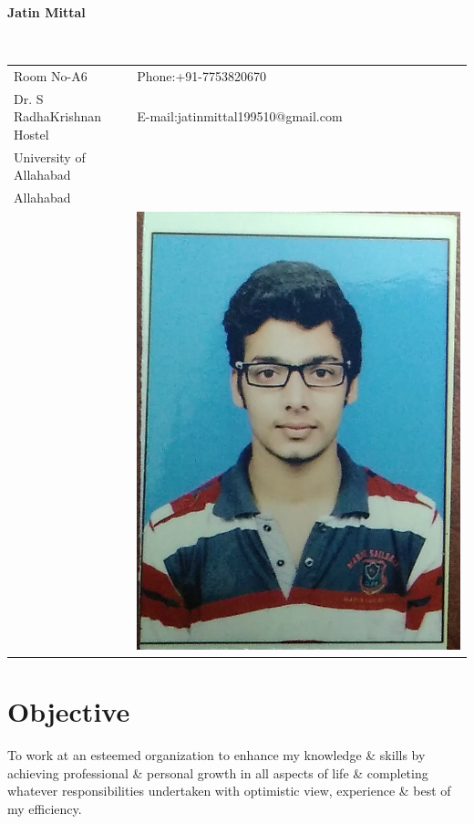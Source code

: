 \documentclass[12pt]{article}
\begin{document}
\vspace{0.5in}
\begin{center}\begin{large}\textbf{Jatin Mittal}\end{large}\end{center}\textbf{\hrulefill}\\

\begin{tabular}{@{}p{4in}p{3in}}
Room No-A6 & {Phone:}+91-7753820670 \\
Dr. S RadhaKrishnan Hostel & {E-mail:}jatinmittal199510@gmail.com\\
University of Allahabad \\
Allahabad\\
& \includegraphics[scale=0.2]{my.jpg}\\
\end{tabular}

\section*{Objective}
To work at an esteemed organization to enhance my knowledge \& skills by achieving professional \& personal growth in all aspects of life \& completing whatever responsibilities undertaken with optimistic view, experience \& best of my efficiency. 
\end{document}

